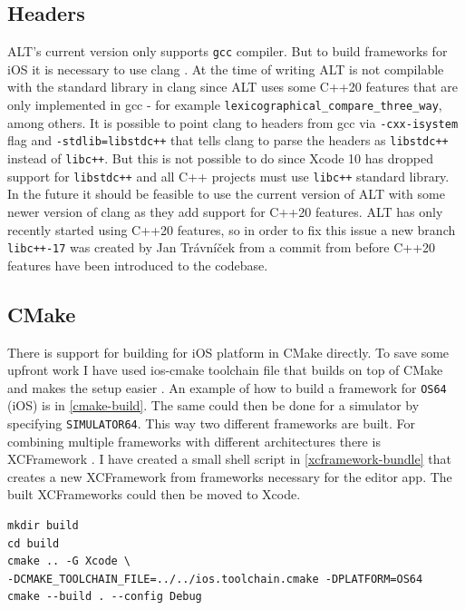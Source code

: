 \subsection{Headers}
ALT's current version only supports \lstinline{gcc} compiler. But to build frameworks for iOS it is necessary to use clang \cite{clang}. At the time of writing ALT is not compilable with the standard library in clang since ALT uses some C++20 features that are only implemented in gcc - for example \lstinline{lexicographical_compare_three_way}, among others. It is possible to point clang to headers from gcc via \lstinline{-cxx-isystem} flag and \lstinline{-stdlib=libstdc++} that tells clang to parse the headers as \lstinline{libstdc++} instead of \lstinline{libc++}. But this is not possible to do since Xcode 10 has dropped support for \lstinline{libstdc++} and all C++ projects must use \lstinline{libc++} standard library. In the future it should be feasible to use the current version of ALT with some newer version of clang as they add support for C++20 features. ALT has only recently started using C++20 features, so in order to fix this issue a new branch \lstinline{libc++-17} was created by Jan Trávníček from a commit from before C++20 features have been introduced to the codebase.

\subsection{CMake}

There is support for building for iOS platform in CMake directly. To save some upfront work I have used ios-cmake toolchain file that builds on top of CMake and makes the setup easier \cite{ios-cmake}. An example of how to build a framework for \lstinline{OS64} (iOS) is in \ref{cmake-build}. The same could then be done for a simulator by specifying \lstinline{SIMULATOR64}. This way two different frameworks are built. For combining multiple frameworks with different architectures there is XCFramework \cite{xcframework}. I have created a small shell script in \ref{xcframework-bundle} that creates a new XCFramework from frameworks necessary for the editor app. The built XCFrameworks could then be moved to Xcode.

\begin{lstlisting}[caption=CMake build instructions, label=cmake-build]
mkdir build
cd build
cmake .. -G Xcode \
-DCMAKE_TOOLCHAIN_FILE=../../ios.toolchain.cmake -DPLATFORM=OS64
cmake --build . --config Debug
\end{lstlisting}


